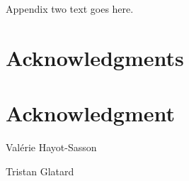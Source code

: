 \documentclass[10pt,journal,compsoc]{IEEEtran}
\begin{document}

%


\appendices
\section{}
Appendix two text goes here.


\ifCLASSOPTIONcompsoc
  \section*{Acknowledgments}
\else
  \section*{Acknowledgment}
\fi







\begin{IEEEbiography}{Val\'erie Hayot-Sasson}
\end{IEEEbiography}
\begin{IEEEbiography}{Tristan Glatard}
\end{IEEEbiography}
\end{document}
